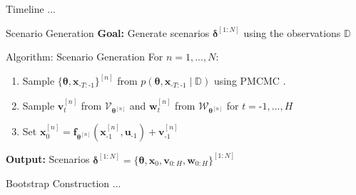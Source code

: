 \documentclass[student, noshadow, itr, english, aspectratio=169]{ITR_LSR_slides}
\begin{document}
	\appendix


\begin{frame}{\LSRITRRefTitle}
	\printbibliography
\end{frame}

\begin{frame}{Timeline}
...
\end{frame}

\begin{frame}{Scenario Generation}
\textbf{Goal:} Generate scenarios $\boldsymbol{\delta}^{[1:N]}$ using the observations $\mathbb{D}$\\
\begin{block}{Algorithm: Scenario Generation}
For $n = 1,...,N$:
\begin{enumerate}
  \item Sample $\{ \boldsymbol{\theta}, \boldsymbol{x}_{\text{-}T:\text{-}1} \}^{[n]}$ from $p\left( \boldsymbol{\theta}, \boldsymbol{x}_{\text{-}T:\text{-}1} \mid \mathbb{D} \right)$ using PMCMC \cite{Robert_24}.
  \item Sample $\boldsymbol{v}_t^{[n]}$ from $\boldsymbol{\mathcal{V}}_{\boldsymbol{\theta}^{[n]}}$ and  $\boldsymbol{w}_t^{[n]}$ from $\boldsymbol{\mathcal{W}}_{\boldsymbol{\theta}^{[n]}}$ for $t = \text{-}1, ..., H$
  \item Set $\boldsymbol{x}_0^{[n]} = \boldsymbol{f}_{\boldsymbol{\theta}^{[n]}} \left( \boldsymbol{x}_{\text{-} 1}^{[n]}, \boldsymbol{u}_{\text{-} 1} \right) + \boldsymbol{v}_{\text{-} 1}^{[n]}$
\end{enumerate}
\textbf{Output:} Scenarios $\boldsymbol{\delta}^{[1:N]} = \{ \boldsymbol{\theta}, \boldsymbol{x}_0, \boldsymbol{v}_{0:H}, \boldsymbol{w}_{0:H}\}^{[1:N]}$
\end{block}
\end{frame}

\begin{frame}{Bootstrap Construction}
...
\end{frame}
\end{document}
